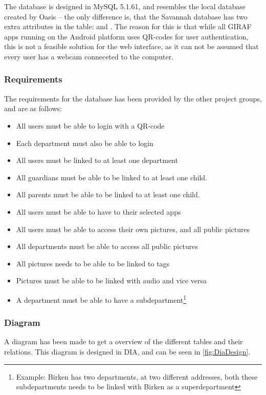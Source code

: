 The database is designed in MySQL 5.1.61, and resembles the local database created by Oasis -- the only difference is, that the Savannah database has two extra attributes in the  table:  and . The reason for this is that while all GIRAF apps running on the Android platform uses QR-codes for user authentication, this is not a feasible solution for the web interface, as it can not be assumed that every user has a webcam conneceted to the computer.

\subsubsection{Requirements}
The requirements for the database has been provided by the other project groups, and are as follows:

\begin{itemize} %
	\item All users must be able to login with a QR-code
	\item Each department must also be able to login
	\item All users must be linked to at least one department
	\item All guardians must be able to be linked to at least one child.
	\item All parents must be able to be linked to at least one child.
	\item All users must be able to have to their selected apps
	\item All users must be able to access their own pictures, and all public pictures
	\item All departments must be able to access all public pictures
	\item All pictures needs to be able to be linked to tags
	\item Pictures must be able to be linked with audio and vice versa
	\item A department must be able to have a subdepartment\footnote{Example: Birken has two departments, at two different addresses, both these subdepartments needs to be linked with Birken as a superdepartment}
\end{itemize}

\subsubsection*{Diagram} %
A diagram has been made to get a overview of the different tables and their relations. This diagram is designed in DIA\cite{Dia}, and can be seen in \autoref{fig:DiaDesign}.

